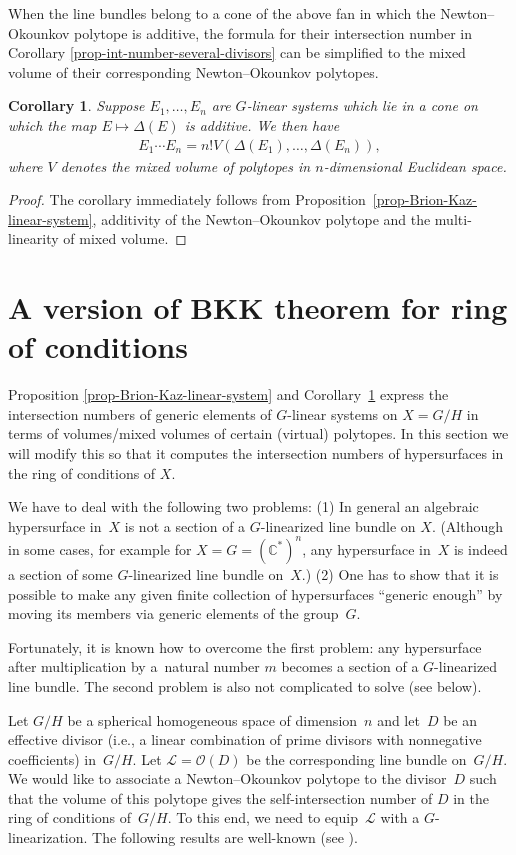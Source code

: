 \documentclass[pdftex]{sigma}
\def \C{\mathbb{C}}
\numberwithin{equation}{section}
\newtheorem{Cor}[Th]{Corollary}
\theoremstyle{definition}
\begin{document}
When the line bundles belong to a cone of the above fan in which the Newton--Okounkov polytope is additive, the formula for their intersection number in Corollary \ref{prop-int-number-several-divisors} can be simplified to the mixed volume of their corresponding Newton--Okounkov polytopes.
\begin{Cor} \label{cor-mixed-vol-Brion-Kaz}
Suppose $E_1, \ldots, E_n$ are $G$-linear systems which lie in a cone on which the map $E \mapsto \Delta(E)$ is additive. We then have
\begin{gather*} E_1 \cdots E_n = n! V(\Delta(E_1), \ldots, \Delta(E_n)),\end{gather*}
where $V$ denotes the mixed volume of polytopes in $n$-dimensional Euclidean space.
\end{Cor}
\begin{proof}The corollary immediately follows from Proposition~\ref{prop-Brion-Kaz-linear-system}, additivity of the Newton--Okounkov polytope and the multi-linearity of mixed volume.
\end{proof}

\section{A version of BKK theorem for ring of conditions}\label{sec-BKK-spherical}
Proposition \ref{prop-Brion-Kaz-linear-system} and Corollary~\ref{cor-mixed-vol-Brion-Kaz} express the intersection numbers of generic elements of $G$-linear systems on $X=G/H$ in terms of volumes/mixed volumes of certain (virtual) polytopes. In this section we will modify this so that it computes the intersection numbers of hypersurfaces in the ring of conditions of $X$.

We have to deal with the following two problems: (1) In general an algebraic hypersurface in~$X$ is not a section of a $G$-linearized line bundle on $X$. (Although in some cases, for example for $X=G=(\C^*)^n$, any hypersurface in~$X$ is indeed a section of some $G$-linearized line bundle on~$X$.) (2) One has to show that it is possible to make any given finite collection of hypersurfaces ``generic enough'' by moving its members via generic elements of the group~$G$.

Fortunately, it is known how to overcome the first problem: any hypersurface after multiplication by a~natural number $m$ becomes a section of a $G$-linearized line bundle. The second problem is also not complicated to solve (see below).

Let $G/H$ be a spherical homogeneous space of dimension~$n$ and let~$D$ be an effective divisor (i.e., a linear combination of prime divisors with nonnegative coefficients) in~$G/H$. Let ${\mathcal L} = \mathcal{O}(D)$ be the corresponding line bundle on~$G/H$. We would like to associate a Newton--Okounkov polytope to the divisor~$D$ such that the volume of this polytope gives the self-intersection number of $D$ in the ring of conditions of~$G/H$. To this end, we need to equip~${\mathcal L}$ with a $G$-linearization. The following results are well-known (see \cite{KKLV, Popov}).
\end{document}
